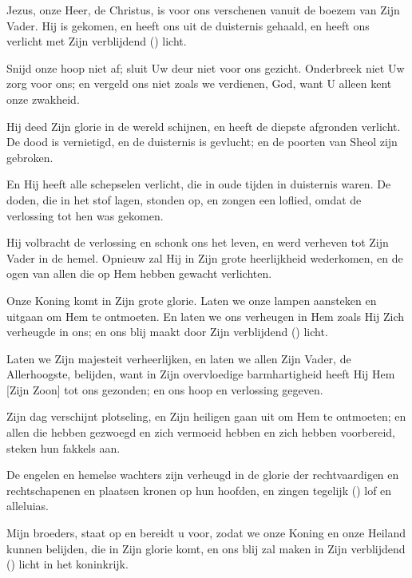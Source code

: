 \documentclass[12pt,twoside,a5paper]{article}
\begin{document}




\begin{halfparskip}
   Jezus, onze Heer, de Christus, is voor ons verschenen vanuit de boezem van Zijn Vader. Hij is gekomen, en heeft ons uit de duisternis gehaald, en heeft ons verlicht met Zijn verblijdend () licht.

   Snijd onze hoop niet af; sluit Uw deur niet voor ons gezicht. Onderbreek niet Uw zorg voor ons; en vergeld ons niet zoals we verdienen, God, want U alleen kent onze zwakheid.

   Hij deed Zijn glorie in de wereld schijnen, en heeft de diepste afgronden verlicht. De dood is vernietigd, en de duisternis is gevlucht; en de poorten van Sheol zijn gebroken.

   En Hij heeft alle schepselen verlicht, die in oude tijden in duisternis waren. De doden, die in het stof lagen, stonden op, en zongen een loflied, omdat de verlossing tot hen was gekomen.

   Hij volbracht de verlossing en schonk ons het leven, en werd verheven tot Zijn Vader in de hemel. Opnieuw zal Hij in Zijn grote heerlijkheid wederkomen, en de ogen van allen die op Hem hebben gewacht verlichten.

   Onze Koning komt in Zijn grote glorie. Laten we onze lampen aansteken en uitgaan om Hem te ontmoeten. En laten we ons verheugen in Hem zoals Hij Zich verheugde in ons; en ons blij maakt door Zijn verblijdend () licht.

   Laten we Zijn majesteit verheerlijken, en laten we allen Zijn Vader, de Allerhoogste, belijden, want in Zijn overvloedige barmhartigheid heeft Hij Hem [Zijn Zoon] tot ons gezonden; en ons hoop en verlossing gegeven.

   Zijn dag verschijnt plotseling, en Zijn heiligen gaan uit om Hem te ontmoeten; en allen die hebben gezwoegd en zich vermoeid hebben en zich hebben voorbereid, steken hun fakkels aan.

   De engelen en hemelse wachters zijn verheugd in de glorie der rechtvaardigen en rechtschapenen en plaatsen kronen op hun hoofden, en zingen tegelijk () lof en alleluias.

   Mijn broeders, staat op en bereidt u voor, zodat we onze Koning en onze Heiland kunnen belijden, die in Zijn glorie komt, en ons blij zal maken in Zijn verblijdend () licht in het koninkrijk.
\end{halfparskip}
\end{document}
